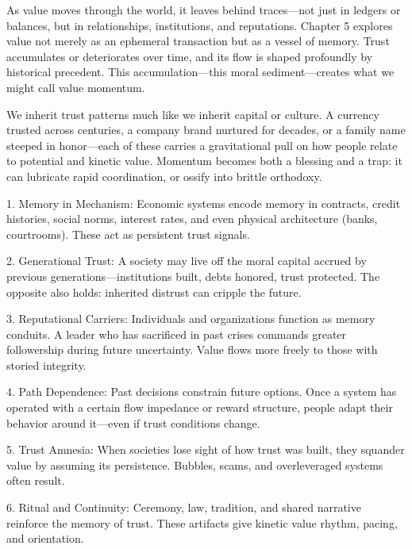 \documentclass[11pt,oneside]{book}
\begin{document}
As value moves through the world, it leaves behind traces—not just in ledgers or balances, but in relationships, institutions, and reputations. Chapter 5 explores value not merely as an ephemeral transaction but as a vessel of memory. Trust accumulates or deteriorates over time, and its flow is shaped profoundly by historical precedent. This accumulation—this moral sediment—creates what we might call value momentum.

We inherit trust patterns much like we inherit capital or culture. A currency trusted across centuries, a company brand nurtured for decades, or a family name steeped in honor—each of these carries a gravitational pull on how people relate to potential and kinetic value. Momentum becomes both a blessing and a trap: it can lubricate rapid coordination, or ossify into brittle orthodoxy.


1. Memory in Mechanism: Economic systems encode memory in contracts, credit histories, social norms, interest rates, and even physical architecture (banks, courtrooms). These act as persistent trust signals.



2. Generational Trust: A society may live off the moral capital accrued by previous generations—institutions built, debts honored, trust protected. The opposite also holds: inherited distrust can cripple the future.



3. Reputational Carriers: Individuals and organizations function as memory conduits. A leader who has sacrificed in past crises commands greater followership during future uncertainty. Value flows more freely to those with storied integrity.



4. Path Dependence: Past decisions constrain future options. Once a system has operated with a certain flow impedance or reward structure, people adapt their behavior around it—even if trust conditions change.



5. Trust Amnesia: When societies lose sight of how trust was built, they squander value by assuming its persistence. Bubbles, scams, and overleveraged systems often result.



6. Ritual and Continuity: Ceremony, law, tradition, and shared narrative reinforce the memory of trust. These artifacts give kinetic value rhythm, pacing, and orientation.
\end{document}
